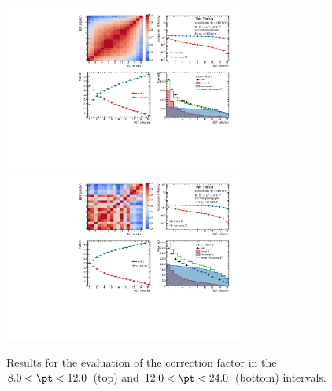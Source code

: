\begin{figure}
    \centering
    \includegraphics[width=0.7\textwidth]{Figures/Chapter 6/AllPropmtFracs/Ds/DsPromptFrac80_120.pdf}
    \includegraphics[width=0.7\textwidth]{Figures/Chapter 6/AllPropmtFracs/Ds/DsPromptFrac120_240.pdf}
    \caption{Results for the evaluation of the \fpds correction factor in the $8.0 < \pt < 12.0$~\gevc (top) and $12.0 < \pt < 24.0$~\gevc (bottom) intervals.}
    \end{figure}

